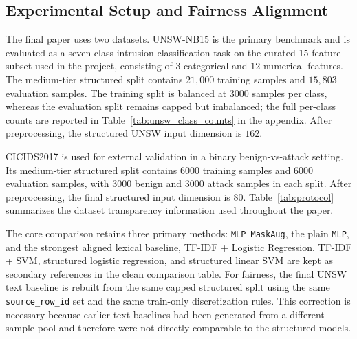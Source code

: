 \subsection{Experimental Setup and Fairness Alignment}
The final paper uses two datasets. UNSW-NB15 is the primary benchmark and is evaluated as a seven-class intrusion classification task on the curated 15-feature subset used in the project, consisting of $3$ categorical and $12$ numerical features. The medium-tier structured split contains $21{,}000$ training samples and $15{,}803$ evaluation samples. The training split is balanced at $3000$ samples per class, whereas the evaluation split remains capped but imbalanced; the full per-class counts are reported in Table~\ref{tab:unsw_class_counts} in the appendix. After preprocessing, the structured UNSW input dimension is $162$.

CICIDS2017 is used for external validation in a binary benign-vs-attack setting. Its medium-tier structured split contains $6000$ training samples and $6000$ evaluation samples, with $3000$ benign and $3000$ attack samples in each split. After preprocessing, the final structured input dimension is $80$. Table~\ref{tab:protocol} summarizes the dataset transparency information used throughout the paper.

\begin{table}[t]
\centering
\caption{Dataset and protocol transparency summary for the final experiments.}
\label{tab:protocol}
\end{table}

The core comparison retains three primary methods: \texttt{MLP MaskAug}, the plain \texttt{MLP}, and the strongest aligned lexical baseline, TF-IDF + Logistic Regression. TF-IDF + SVM, structured logistic regression, and structured linear SVM are kept as secondary references in the clean comparison table. For fairness, the final UNSW text baseline is rebuilt from the same capped structured split using the same \texttt{source\_row\_id} set and the same train-only discretization rules. This correction is necessary because earlier text baselines had been generated from a different sample pool and therefore were not directly comparable to the structured models.

